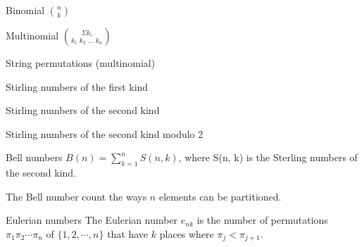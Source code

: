 

\begin{algorithm}{Binomial $\binom{n}{k}$}
\end{algorithm}

\begin{algorithm}{Multinomial $\binom{\Sigma k_i}{k_1\;k_2\;\ldots\;k_n}$}
\end{algorithm}

\begin{algorithm}{String permutations (multinomial)}
\end{algorithm}

\begin{algorithm}{Stirling numbers of the first kind}
\end{algorithm}

\begin{algorithm}{Stirling numbers of the second kind}
\end{algorithm}

\begin{algorithm}{Stirling numbers of the second kind modulo 2}
\end{algorithm}


\begin{algorithm}{Bell numbers}
\desc{}
$B(n) = \sum_{k=1}^n S(n,k)$, where S(n, k) is the Sterling numbers of the second kind.

The Bell number count the ways $n$ elements can be partitioned.
\end{algorithm}

\begin{algorithm}{Eulerian numbers}
\desc{}
The Eulerian number $e_{nk}$ is the number of permutations $\pi_1 \pi_2 \cdots \pi_n$ of $\{1,2,\cdots,n\}$ that have $k$ places where $\pi_j < \pi_{j+1}$.
\end{algorithm}

